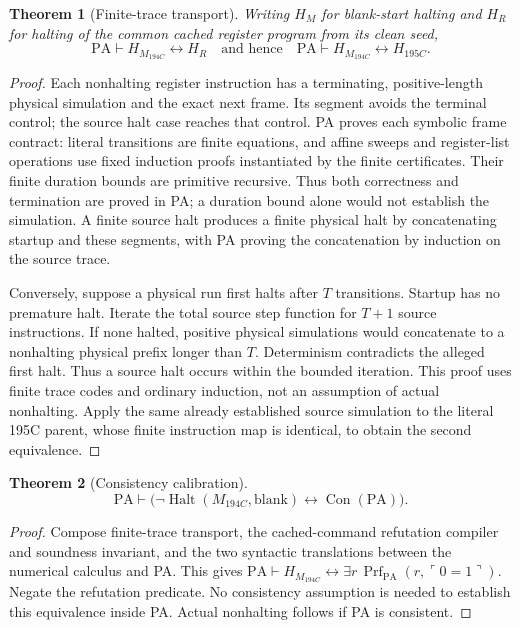 \documentclass[11pt,letterpaper]{article}
\newcommand{\PA}{\mathrm{PA}}\newcommand{\Con}{\operatorname{Con}}
\newcommand{\Prf}{\operatorname{Prf}}\newcommand{\Halt}{\operatorname{Halt}}
\newcommand{\MC}{M_{194C}}\newcommand{\MS}{M_{194}}
\newtheorem{theorem}{Theorem}[section]\newtheorem{lemma}[theorem]{Lemma}\newtheorem{proposition}[theorem]{Proposition}
\begin{document}
\begin{theorem}[Finite-trace transport]\label{thm:transport}
Writing $H_M$ for blank-start halting and $H_R$ for halting of the common cached
register program from its clean seed,
\[
 \PA\vdash H_{\MC}\leftrightarrow H_R
 \quad\text{and hence}\quad
 \PA\vdash H_{\MC}\leftrightarrow H_{195C}.
\]
\end{theorem}
\begin{proof}
Each nonhalting register instruction has a terminating, positive-length
physical simulation and the exact next frame. Its segment avoids the terminal
control; the source halt case reaches that control. PA proves each symbolic
frame contract: literal transitions are finite equations, and affine sweeps
and register-list operations use fixed induction proofs instantiated by the
finite certificates. Their finite duration bounds are primitive recursive.
Thus both correctness and termination are proved in PA; a duration bound
alone would not establish the simulation. A finite source halt produces a
finite physical halt by concatenating startup and these segments, with
PA proving the concatenation by induction on the source trace.

Conversely, suppose a physical run first halts after $T$ transitions.
Startup has no premature halt. Iterate the total source step function for
$T+1$ source instructions. If none halted, positive physical simulations would
concatenate to a nonhalting physical prefix longer than $T$. Determinism
contradicts the alleged first halt. Thus a source halt occurs within the
bounded iteration. This proof uses finite trace codes and ordinary induction,
not an assumption of actual nonhalting. Apply the same already established
source simulation to the literal 195C parent, whose finite instruction map is
identical, to obtain the second equivalence.
\end{proof}

\begin{theorem}[Consistency calibration]
\[
 \boxed{\displaystyle
 \PA\vdash\bigl(\neg\Halt(\MC,\mathrm{blank})\leftrightarrow\Con(\PA)\bigr).}
\]
\end{theorem}
\begin{proof}
Compose finite-trace transport, the cached-command refutation compiler and
soundness invariant, and the two syntactic translations between the numerical
calculus and PA. This gives $\PA\vdash H_{\MC}\leftrightarrow
\exists r\,\Prf_{\PA}(r,\ulcorner0=1\urcorner)$. Negate the refutation
predicate. No consistency assumption is needed to establish this equivalence
inside PA. Actual nonhalting follows if PA is consistent.
\end{proof}
\end{document}
